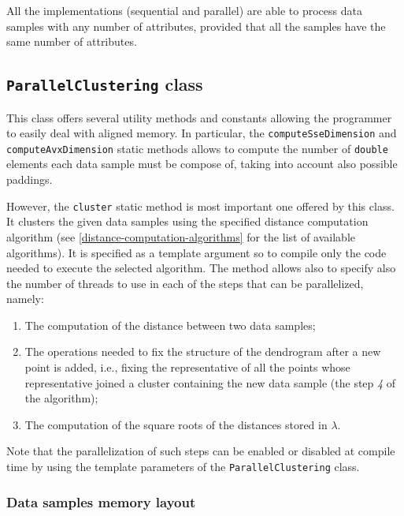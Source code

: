 \documentclass{article}
\begin{document}
All the implementations (sequential and parallel) are able to process data samples with any
number of attributes, provided that all the samples have the same number of attributes.

\hypertarget{parallel-clustering}{%
\subsection{\texttt{ParallelClustering} class}
\label{parallel-clustering}}
This class offers several utility methods and constants allowing the programmer to easily deal
with aligned memory. In particular, the \texttt{computeSseDimension} and
\texttt{computeAvxDimension} static methods allows to compute the number of \texttt{double}
elements each data sample must be compose of, taking into account also possible paddings.

However, the \texttt{cluster} static method is most important one offered by this class. It clusters
the given data samples using the specified distance computation algorithm (see
\ref{distance-computation-algorithms} for the list of available algorithms).
It is specified as a template argument so to compile only the code needed to execute the selected
algorithm.
The method allows also to specify also the number of threads to use in each of the steps that can be
parallelized, namely:
\begin{enumerate}
\item The computation of the distance between two data samples;
\item The operations needed to fix the structure of the dendrogram after a new point is
added, i.e., fixing the representative of all the points whose representative joined a
cluster containing the new data sample (the step \textit{4} of the algorithm);
\item The computation of the square roots of the distances stored in $\lambda$.
\end{enumerate}
Note that the parallelization of such steps can be enabled or disabled at compile time by using the
template parameters of the \texttt{ParallelClustering} class.

\hypertarget{par-data-samples-layout}{
\subsubsection{Data samples memory layout}
\label{par-data-samples-layout}}
\end{document}
